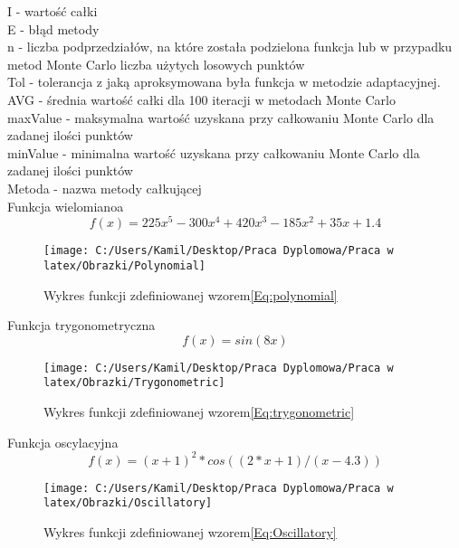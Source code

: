 \documentclass[12pt,twoside]{article}
\begin{document}
I - wartość całki\\
E - błąd metody\\
n - liczba podprzedziałów, na które została podzielona funkcja lub w przypadku metod Monte Carlo liczba użytych losowych punktów\\
Tol - tolerancja z jaką aproksymowana była funkcja w metodzie adaptacyjnej.\\
AVG - średnia wartość całki dla 100 iteracji w metodach Monte Carlo\\
maxValue - maksymalna wartość uzyskana przy całkowaniu Monte Carlo dla zadanej ilości punktów\\
minValue - minimalna wartość uzyskana przy całkowaniu Monte Carlo dla zadanej ilości punktów\\
Metoda - nazwa metody całkującej\\

Funkcja wielomianoa
\begin{equation}
f(x) = 225x^5 - 300x^4 + 420x^3-185x^2+35x + 1.4
\label{Eq:polynomial}
\end{equation}

\begin{figure}[h]
\centering
\texttt{[image: C:/Users/Kamil/Desktop/Praca Dyplomowa/Praca w latex/Obrazki/Polynomial]}
\caption{Wykres funkcji zdefiniowanej wzorem\eqref{Eq:polynomial}}
\label{wielomian}
\end{figure}

Funkcja trygonometryczna
\begin{equation}
f(x) = sin(8x)
\label{Eq:trygonometric}
\end{equation}

\begin{figure}[h]
\centering
\texttt{[image: C:/Users/Kamil/Desktop/Praca Dyplomowa/Praca w latex/Obrazki/Trygonometric]}
\caption{Wykres funkcji zdefiniowanej wzorem\eqref{Eq:trygonometric}}
\label{trygonometryczna}
\end{figure}

Funkcja oscylacyjna
\begin{equation}
f(x) = (x+1)^2*cos((2*x+1)/(x-4.3))
\label{Eq:Oscillatory}
\end{equation}

\begin{figure}[t]
\centering
\texttt{[image: C:/Users/Kamil/Desktop/Praca Dyplomowa/Praca w latex/Obrazki/Oscillatory]}
\caption{Wykres funkcji zdefiniowanej wzorem\eqref{Eq:Oscillatory}}
\label{oscylacyjna}
\end{figure}
\end{document}
